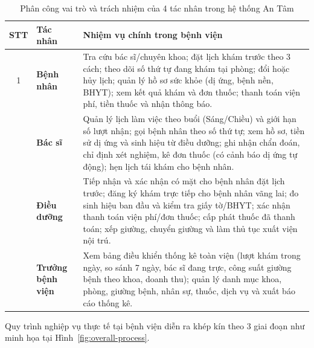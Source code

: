\documentclass[12pt,a4paper]{report}
\begin{document}
\begin{table}[H]
  \centering
  \caption{Phân công vai trò và trách nhiệm của 4 tác nhân trong hệ thống An Tâm}
  \label{tab:actors}
  \begin{tabularx}{\textwidth}{@{}c l X@{}}
    \toprule
    \textbf{STT} & \textbf{Tác nhân} & \textbf{Nhiệm vụ chính trong bệnh viện} \\
    \midrule
    1 & \textbf{Bệnh nhân} & Tra cứu bác sĩ/chuyên khoa; đặt lịch khám trước theo 3 cách; theo dõi số thứ tự đang khám tại phòng; đổi hoặc hủy lịch; quản lý hồ sơ sức khỏe (dị ứng, bệnh nền, BHYT); xem kết quả khám và đơn thuốc; thanh toán viện phí, tiền thuốc và nhận thông báo. \\
    \addlinespace
    2 & \textbf{Bác sĩ} & Quản lý lịch làm việc theo buổi (Sáng/Chiều) và giới hạn số lượt nhận; gọi bệnh nhân theo số thứ tự; xem hồ sơ, tiền sử dị ứng và sinh hiệu từ điều dưỡng; ghi nhận chẩn đoán, chỉ định xét nghiệm, kê đơn thuốc (có cảnh báo dị ứng tự động); hẹn lịch tái khám cho bệnh nhân. \\
    \addlinespace
    3 & \textbf{Điều dưỡng} & Tiếp nhận và xác nhận có mặt cho bệnh nhân đặt lịch trước; đăng ký khám trực tiếp cho bệnh nhân vãng lai; đo sinh hiệu ban đầu và kiểm tra giấy tờ/BHYT; xác nhận thanh toán viện phí/đơn thuốc; cấp phát thuốc đã thanh toán; xếp giường, chuyển giường và làm thủ tục xuất viện nội trú. \\
    \addlinespace
    4 & \textbf{Trưởng bệnh viện} & Xem bảng điều khiển thống kê toàn viện (lượt khám trong ngày, so sánh 7 ngày, bác sĩ đang trực, công suất giường bệnh theo khoa, doanh thu); quản lý danh mục khoa, phòng, giường bệnh, nhân sự, thuốc, dịch vụ và xuất báo cáo thống kê. \\
    \bottomrule
  \end{tabularx}
\end{table}

Quy trình nghiệp vụ thực tế tại bệnh viện diễn ra khép kín theo 3 giai đoạn như minh họa tại Hình~\ref{fig:overall-process}.
\end{document}
